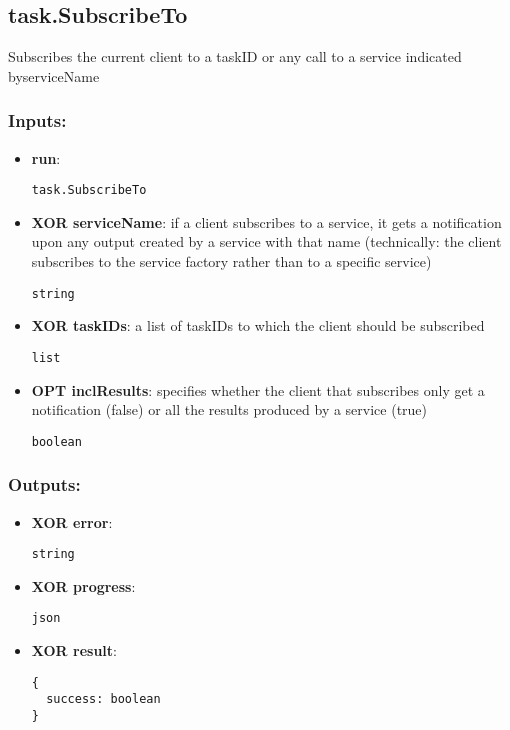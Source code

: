 \subsection{task.SubscribeTo}
\label{ch:builtinservices:task.SubscribeTo}
Subscribes the current client to a taskID or any call to a service indicated byserviceName
\subsubsection*{Inputs:}
\begin{itemize}
    \item \textbf{run}: 
\begin{lstlisting}
task.SubscribeTo
\end{lstlisting}
    \item \textbf{XOR serviceName}: if a client subscribes to a service, it gets a notification upon any  output created by a service with that name (technically: the client  subscribes to the service factory rather than to a specific service)
\begin{lstlisting}
string
\end{lstlisting}
    \item \textbf{XOR taskIDs}: a list of taskIDs to which the client should be subscribed
\begin{lstlisting}
list
\end{lstlisting}
    \item \textbf{OPT inclResults}: specifies whether the client that subscribes only get a notification (false) or all the results produced by a service (true)
\begin{lstlisting}
boolean
\end{lstlisting}
  \end{itemize}

\subsubsection*{Outputs:}
\begin{itemize}
    \item \textbf{XOR error}: 
\begin{lstlisting}
string
\end{lstlisting}
    \item \textbf{XOR progress}: 
\begin{lstlisting}
json
\end{lstlisting}
    \item \textbf{XOR result}: 
\begin{lstlisting}
{
  success: boolean
}
\end{lstlisting}
  \end{itemize}

